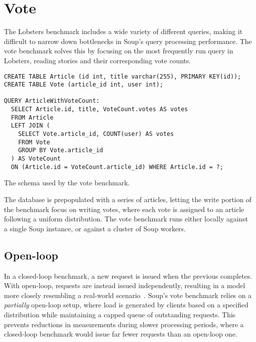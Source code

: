 \section{Vote}\label{sec:vote}

The Lobsters benchmark includes a wide variety of different queries, making it
difficult to narrow down bottlenecks in Soup's query processing performance. The
vote benchmark solves this by focusing on the most frequently run query in
Lobsters, reading stories and their corresponding vote counts.

\begin{listing}[H]
  \begin{verbatim}
CREATE TABLE Article (id int, title varchar(255), PRIMARY KEY(id));
CREATE TABLE Vote (article_id int, user int);

QUERY ArticleWithVoteCount:
  SELECT Article.id, title, VoteCount.votes AS votes
  FROM Article
  LEFT JOIN (
    SELECT Vote.article_id, COUNT(user) AS votes
    FROM Vote
    GROUP BY Vote.article_id
  ) AS VoteCount
  ON (Article.id = VoteCount.article_id) WHERE Article.id = ?;
  \end{verbatim}

  \caption{The schema used by the vote benchmark.}\label{lst:vote}
\end{listing}

The database is prepopulated with a series of articles, letting the write
portion of the benchmark focus on writing votes, where each vote is assigned to
an article following a uniform distribution. The vote benchmark runs either
locally against a single Soup instance, or against a cluster of Soup workers.

\subsection{Open-loop}\label{sec:vote-open-loop}

In a closed-loop benchmark, a new request is issued when the previous completes.
With open-loop, requests are instead issued independently, resulting in a model
more closely resembling a real-world scenario~\cite{open-loop}. Soup's vote
benchmark relies on a \textit{partially} open-loop setup, where load is
generated by clients based on a specified distribution while maintaining a
capped queue of outstanding requests. This prevents reductions in measurements
during slower processing periods, where a closed-loop benchmark would issue far
fewer requests than an open-loop one.

